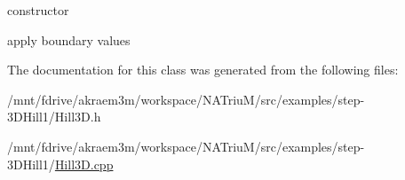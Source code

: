 constructor 

apply boundary values 

The documentation for this class was generated from the following files:\begin{DoxyCompactItemize}
\item 
/mnt/fdrive/akraem3m/workspace/NATriuM/src/examples/step-\/3DHill1/Hill3D.h\item 
/mnt/fdrive/akraem3m/workspace/NATriuM/src/examples/step-\/3DHill1/\hyperlink{Hill3D_8cpp}{Hill3D.cpp}\end{DoxyCompactItemize}
